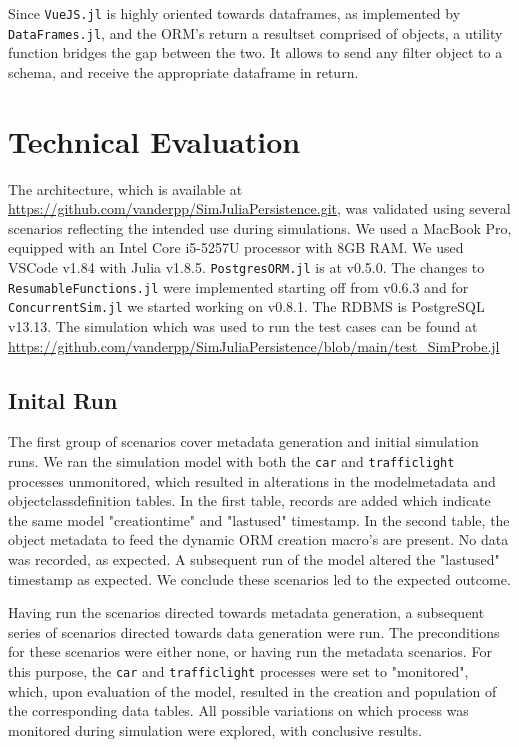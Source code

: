 \documentclass{juliacon}
\begin{document}
Since \texttt{VueJS.jl} is highly oriented towards dataframes, as implemented by \texttt{DataFrames.jl}, and the ORM's return a resultset comprised of objects, a utility function bridges the gap between the two. It allows to send any filter object to a schema, and receive the appropriate dataframe in return.\vskip 6pt

\section{Technical Evaluation}

The architecture, which is available at \url{https://github.com/vanderpp/SimJuliaPersistence.git}, was validated using several scenarios reflecting the intended use during simulations. We used a MacBook Pro, equipped with an Intel Core i5-5257U processor with 8GB RAM. We used VSCode v1.84 with Julia v1.8.5. \texttt{PostgresORM.jl} is at v0.5.0. The changes to \texttt{ResumableFunctions.jl} were implemented starting off from v0.6.3 and for \texttt{ConcurrentSim.jl}  we started working on v0.8.1. The RDBMS is PostgreSQL v13.13. The simulation which was used to run the test cases can be found at \url{https://github.com/vanderpp/SimJuliaPersistence/blob/main/test_SimProbe.jl}\vskip 6pt

\subsection{Inital Run}

The first group of scenarios cover metadata generation and initial simulation runs. We ran the simulation model with both the \texttt{car} and \texttt{trafficlight} processes unmonitored, which resulted in alterations in the modelmetadata and objectclassdefinition tables. In the first table, records are added which indicate the same model "creationtime" and "lastused" timestamp. In the second table, the object metadata to feed the dynamic ORM creation macro's are present. No data was recorded, as expected. A subsequent run of the model altered the "lastused" timestamp as expected. We conclude these scenarios led to the expected outcome. \vskip 6pt

Having run the scenarios directed towards metadata generation, a subsequent series of scenarios directed towards data generation were run. The preconditions for these scenarios were either none, or having run the metadata scenarios. For this purpose, the \texttt{car} and \texttt{trafficlight} processes were set to "monitored", which, upon evaluation of the model, resulted in the creation and population of the corresponding data tables. All possible variations on which process was monitored during simulation were explored, with conclusive results. \vskip 6pt
\end{document}
